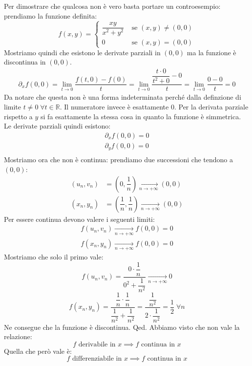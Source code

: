 {	Per dimostrare che qualcosa non è vero basta portare un controesempio: 
	prendiamo la funzione definita:
	\begin{equation*}
		f(x, y) = 
		\begin{cases}
			\dfrac{xy}{x^2 + y^2} &\text{ se }(x, y) \neq (0, 0)\\
			0 &\text{ se }(x, y) = (0, 0)
		\end{cases}
	\end{equation*}
	Mostriamo quindi che esistono le derivate parziali in $(0, 0)$ ma la 
	funzione è discontinua in $(0, 0)$.
	\begin{align*}
		\partial_x f(0, 0) = \lim_{t \to 0} \dfrac{f(t, 0) - f(0)}{t} = 
		\lim_{t \to 0} \dfrac{\dfrac{t\cdot 0}{t^2 + 0} - 0}{t} = 
		\lim_{t \to 0} \dfrac{0 - 0}{t} = 0
	\end{align*}
	Da notare che questa non è una forma indeterminata perché dalla 
	definzione di limite $t \neq 0 \; \forall t \in \mathbb{R}$. Il 
	numeratore invece è esattamente $0$. Per la derivata parziale rispetto 
	a $y$ si fa esattamente la stessa cosa in quanto la funzione è 
	simmetrica. Le derivate parziali quindi esistono:
	\begin{align*}
		\partial_x f(0, 0) = 0\\
		\partial_y f(0, 0) = 0\\
	\end{align*}
	Mostriamo ora che non è continua: prendiamo due successioni che tendono 
	a $(0, 0)$:
	\begin{align*}
		(u_n, v_n) &= \left(0, \dfrac{1}{n}\right) \xrightarrow[n \to + 
		\infty]{} (0, 0)\\
		(x_n, y_n) &= \left(\dfrac{1}{n}, \dfrac{1}{n}\right) 
		\xrightarrow[n \to + \infty]{} (0, 0)
	\end{align*}
	Per essere continua devono valere i seguenti limiti:
	\begin{align*}
		f(u_n, v_n) \xrightarrow[n \to +\infty]{} f(0, 0) = 0\\
		f(x_n, y_n) \xrightarrow[n \to +\infty]{} f(0, 0) = 0
	\end{align*}
	Mostriamo che solo il primo vale:
	\begin{equation*}
		f(u_n, v_n) = \dfrac{0 \cdot \dfrac{1}{n}}{0^2 + \dfrac{1}{n^2}} 
		\xrightarrow[n \to +\infty]{} 0
	\end{equation*}
	\begin{equation*}
		f(x_n, y_n) = \dfrac{\dfrac{1}{n} \cdot \dfrac{1}{n}}
		{\dfrac{1}{n^2} + \dfrac{1}{n^2}} = \dfrac{\dfrac{1}{n^2}}
		{2 \cdot \dfrac{1}{n^2}} = \dfrac{1}{2} \; \forall n
	\end{equation*}
	Ne consegue che la funzione è discontinua.
	\hfill Qed.
}
Abbiamo visto che non vale la relazione:
\begin{equation*}
	f \text{ derivabile in } x \implies f \text{ continua in } x
\end{equation*}
Quella che però vale è:
\begin{equation*}
	f \text{ differenziabile in } x \implies f \text{ continua in } x
\end{equation*}

